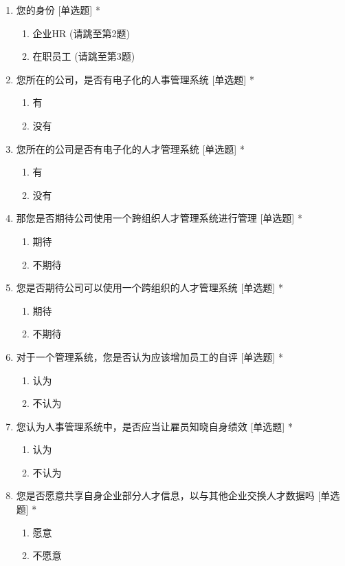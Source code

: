 \documentclass[master]{hduthesis}
\begin{document}
\begin{enumerate}[1.]
	\item 您的身份 [单选题] *
	\begin{enumerate}
		\item 企业HR (请跳至第2题)
		\item 在职员工 (请跳至第3题)
	\end{enumerate}
	\item 您所在的公司，是否有电子化的人事管理系统 [单选题] *
	\begin{enumerate}
		\item 有
		\item 没有
	\end{enumerate}
	\item 您所在的公司是否有电子化的人才管理系统 [单选题] *
	\begin{enumerate}
		\item 有
		\item 没有
	\end{enumerate}
	\item 那您是否期待公司使用一个跨组织人才管理系统进行管理 [单选题] *
	\begin{enumerate}
		\item 期待
		\item 不期待
	\end{enumerate}
	\item 您是否期待公司可以使用一个跨组织的人才管理系统 [单选题] *
	\begin{enumerate}
		\item 期待
		\item 不期待
	\end{enumerate}
	\item 对于一个管理系统，您是否认为应该增加员工的自评 [单选题] *
	\begin{enumerate}
		\item 认为
		\item 不认为
	\end{enumerate}
	\item 您认为人事管理系统中，是否应当让雇员知晓自身绩效 [单选题] *
	\begin{enumerate}
		\item 认为
		\item 不认为
	\end{enumerate}
	\item 您是否愿意共享自身企业部分人才信息，以与其他企业交换人才数据吗 [单选题] *
	\begin{enumerate}
		\item 愿意
		\item 不愿意

\end{enumerate}
\end{enumerate}
\end{document}
